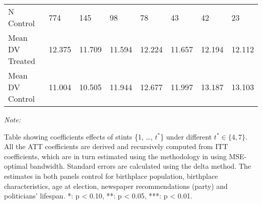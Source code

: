 \begin{table}[!h]
{\begin{threeparttable}
\begin{tabular}[t]{llllllll}
\hspace{1em}N Control & 774 & 145 & 98 & 78 & 43 & 42 & 23\\
\hspace{1em}Mean DV Treated & 12.375 & 11.709 & 11.594 & 12.224 & 11.657 & 12.194 & 12.112\\
\hspace{1em}Mean DV Control & 11.004 & 10.505 & 11.944 & 12.677 & 11.997 & 13.187 & 13.103\\
\bottomrule
\end{tabular}
\begin{tablenotes}[para]
\item \textit{Note: } 
\item Table showing coefficients effects of stints \{1, \dots, $t^*$\} under different $t^* \in \{4,7\}$. All the ATT coefficients are derived and recursively computed from ITT coefficients, which are in turn estimated using the methodology in \citep{cattaneo2019practical} using MSE-optimal bandwidth. Standard errors are calculated using the delta method. The estimates in both panels control for birthplace population, birthplace characteristics, age at election, newspaper recommendations (party) and politicians' lifespan. *: p < 0.10, **: p < 0.05, ***: p < 0.01. 
\end{tablenotes}
\end{threeparttable}}
\end{table}
